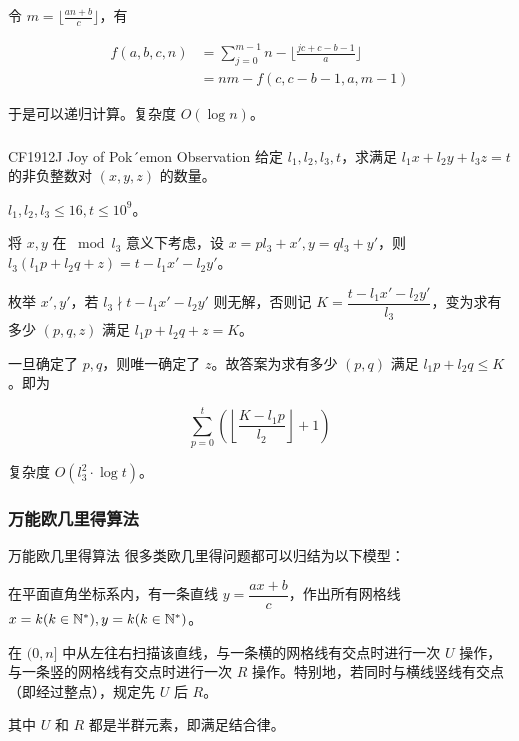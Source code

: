\documentclass[../main.tex]{subfiles}
\begin{document}
\begin{frame}
令 $m=\lfloor\frac{an+b}{c}\rfloor$，有

$$
\begin{aligned}
f(a,b,c,n)&=\sum_{j=0}^{m-1}n-\lfloor\frac{jc+c-b-1}{a}\rfloor\\
&=nm-f(c,c-b-1,a,m-1)
\end{aligned}
$$\pause

于是可以递归计算。复杂度 $O(\log n)$。
\end{frame}

\subsubsection{}

\begin{frame}{CF1912J Joy of Pok´emon Observation}
给定 $l_1,l_2,l_3,t$，求满足 $l_1x+l_2y+l_3z=t$ 的非负整数对 $(x,y,z)$ 的数量。

$l_1,l_2,l_3\le 16,t\le 10^9$。
\end{frame}

\begin{frame}
将 $x,y$ 在 $\bmod l_3$ 意义下考虑，设 $x=pl_3+x',y=ql_3+y'$，则 $l_3(l_1p+l_2q+z)=t-l_1x'-l_2y'$。\pause

枚举 $x',y'$，若 $l_3\nmid  t-l_1x'-l_2y'$ 则无解，否则记 $K=\dfrac{t-l_1x'-l_2y'}{l_3}$，变为求有多少 $(p,q,z)$ 满足 $l_1p+l_2q+z=K$。\pause

一旦确定了 $p,q$，则唯一确定了 $z$。故答案为求有多少 $(p,q)$ 满足 $l_1p+l_2q\le K$。即为

$$
\sum_{p=0}^t(\left\lfloor\frac{K-l_1p}{l_2} \right\rfloor+1)
$$\pause

复杂度 $O(l_3^2\cdot\log t)$。
\end{frame}

\subsubsection{万能欧几里得算法}

\begin{frame}{万能欧几里得算法}
很多类欧几里得问题都可以归结为以下模型：
\bigskip

在平面直角坐标系内，有一条直线 $y=\dfrac{ax+b}{c}$，作出所有网格线 $x=k(k\in\mathbb{N}^*),y=k(k\in\mathbb{N}^*)$。

在 $(0,n]$ 中从左往右扫描该直线，与一条横的网格线有交点时进行一次 $U$ 操作，与一条竖的网格线有交点时进行一次 $R$ 操作。特别地，若同时与横线竖线有交点（即经过整点），规定先 $U$ 后 $R$。

其中 $U$ 和 $R$ 都是半群元素，即满足结合律。
\end{frame}
\end{document}
